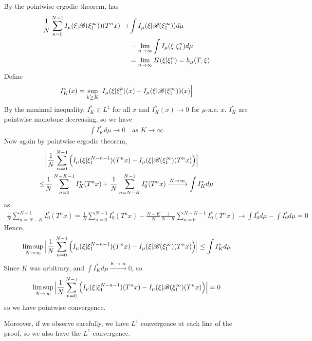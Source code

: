 \documentclass[12pt,a4paper]{report}
\newenvironment{proof}
{\begin{changemargin}{1cm}{0.5cm} 
	}%
	{\end{changemargin}
}
\begin{document}
\begin{proof}
\quad By the pointwise ergodic theorem, has
\begin{align*}
\frac{1}{N} \sum_{n=0}^{N-1} I_{\mu}( \xi | \mathscr{B}(\xi_1^{\infty}) ) (T^n x) \rightarrow & \int I_{\mu}(\xi | \mathscr{B}(\xi_1^{\infty})) d\mu \\
& = \lim_{n\rightarrow \infty} \int I_{\mu}(\xi | \xi_1^n) d\mu \\
& = \lim_{n\rightarrow \infty} H(\xi | \xi_1^n) = h_{\mu}(T, \xi)
\end{align*}
Define
\begin{align*}
I_K^* (x) = \sup_{k\geq K} \Big| I_{\mu}(\xi | \xi_1^k)(x) - I_{\mu}(\xi | \mathscr{B}(\xi_1^{\infty}))(x) \Big|
\end{align*}
By the maximal inequality, $I_K^* \in L^1$ for all $x$ and $I_K^*(x) \rightarrow 0$ for $\mu$-a.e. $x$. $I_K^*$ are pointwise monotone decreasing, so we have
\begin{align*}
\int I_K^* d\mu \rightarrow 0 \quad \text{as } K \rightarrow \infty
\end{align*}
Now again by pointwise ergodic theorem,
\begin{align*}
& \Big| \frac{1}{N} \sum_{n=0}^{N-1} \Big( I_{\mu}(\xi | \xi_1^{N-n-1})(T^n x) - I_{\mu}(\xi | \mathscr{B}(\xi_1^{\infty})(T^n x) \Big) \Big| \\
\leq & \frac{1}{N} \sum_{n=0}^{N-K-1} I_K^* (T^n x) + \frac{1}{N} \sum_{n=N-K}^{N-1} I_0^* (T^n x) \xrightarrow{N\rightarrow \infty} \int I_K^* d\mu
\end{align*}
as 
\begin{align*}
\frac{1}{N} \sum_{n=N-K}^{N-1} I_0^* (T^n x) = \frac{1}{N} \sum_{n=0}^{N-1}I_0^* (T^n x) - \frac{N-K}{N} \frac{1}{N-K} \sum_{n=0}^{N-K-1} I_0^*(T^n x) \rightarrow \int I_0^* d\mu -\int I_0^* d\mu =0
\end{align*}
Hence,
\begin{align*}
\limsup_{N\rightarrow \infty} \Big| \frac{1}{N} \sum_{n=0}^{N-1} \Big( I_{\mu}(\xi | \xi_1^{N-n-1})(T^n x) - I_{\mu}(\xi | \mathscr{B}(\xi_1^{\infty})(T^n x) \Big) \Big| \leq \int I_K^* d\mu
\end{align*}
Since $K$ was arbitrary, and $\int I_K^* d\mu \xrightarrow{K\rightarrow \infty} 0$, so 
\begin{align*}
\limsup_{N\rightarrow \infty} \Big| \frac{1}{N} \sum_{n=0}^{N-1} \Big( I_{\mu}(\xi | \xi_1^{N-n-1})(T^n x) - I_{\mu}(\xi | \mathscr{B}(\xi_1^{\infty})(T^n x) \Big) \Big| =0
\end{align*}
so we have pointwise convergence.

\quad Moreover, if we observe carefully, we have $L^1$ convergence at each line of the proof, so we also have the $L^1$ convergence.

\eop
\end{proof}
\s
\end{document}
